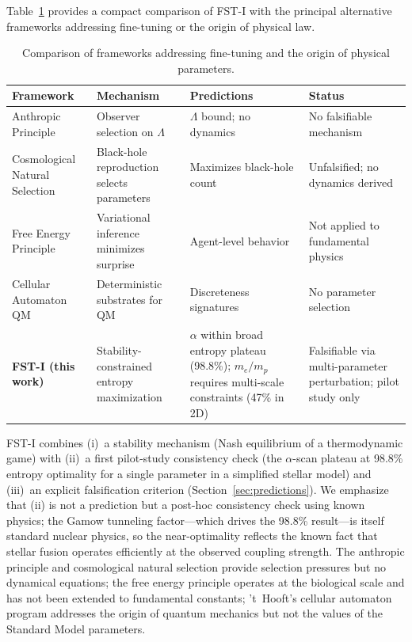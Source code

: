 \documentclass[12pt,a4paper]{article}
\theoremstyle{remark}
\begin{document}
Table~\ref{tab:framework-comparison} provides a compact comparison of FST-I with the principal alternative frameworks addressing fine-tuning or the origin of physical law.

\begin{table}[ht]
\centering
\small
\caption{Comparison of frameworks addressing fine-tuning and the origin of physical parameters.}
\label{tab:framework-comparison}
\begin{tabular}{@{}p{3.2cm}p{3.8cm}p{3.5cm}p{3.5cm}@{}}
\toprule
\textbf{Framework} & \textbf{Mechanism} & \textbf{Predictions} & \textbf{Status} \\
\midrule
Anthropic Principle \citep{Weinberg1987} & Observer selection on $\Lambda$ & $\Lambda$ bound; no dynamics & No falsifiable mechanism \\[4pt]
Cosmological Natural Selection \citep{Smolin1992} & Black-hole reproduction selects parameters & Maximizes black-hole count & Unfalsified; no dynamics derived \\[4pt]
Free Energy Principle \citep{Friston2010} & Variational inference minimizes surprise & Agent-level behavior & Not applied to fundamental physics \\[4pt]
Cellular Automaton QM \citep{tHooft2016} & Deterministic substrates for QM & Discreteness signatures & No parameter selection \\[4pt]
\textbf{FST-I (this work)} & Stability-constrained entropy maximization & $\alpha$ within broad entropy plateau (98.8\%); $m_e/m_p$ requires multi-scale constraints (47\% in 2D) & Falsifiable via multi-parameter perturbation; pilot study only \\
\bottomrule
\end{tabular}
\end{table}

FST-I combines (i)~a stability mechanism (Nash equilibrium of a thermodynamic game) with (ii)~a first pilot-study consistency check (the $\alpha$-scan plateau at 98.8\% entropy optimality for a single parameter in a simplified stellar model) and (iii)~an explicit falsification criterion (Section~\ref{sec:predictions}). We emphasize that (ii) is not a prediction but a post-hoc consistency check using known physics; the Gamow tunneling factor---which drives the 98.8\% result---is itself standard nuclear physics, so the near-optimality reflects the known fact that stellar fusion operates efficiently at the observed coupling strength. The anthropic principle and cosmological natural selection provide selection pressures but no dynamical equations; the free energy principle operates at the biological scale and has not been extended to fundamental constants; 't~Hooft's cellular automaton program addresses the origin of quantum mechanics but not the values of the Standard Model parameters.
\end{document}
